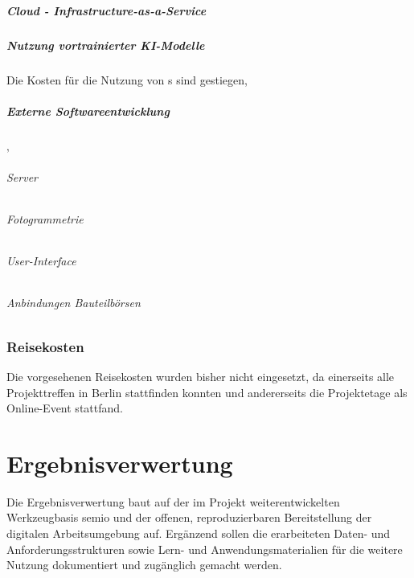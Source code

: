 \documentclass[type=zwischenbericht]{zukunftbau}
\begin{document}
\subsubsection{Cloud - Infrastructure-as-a-Service}
\subsubsection{Nutzung vortrainierter KI-Modelle}
Die Kosten für die Nutzung von s sind gestiegen, 

\subsubsection{Externe Softwareentwicklung}
\begin{SemioNest}‚
\paragraph{Server}
\paragraph{Fotogrammetrie}
\paragraph{User-Interface}
\paragraph{Anbindungen Bauteilbörsen}
\end{SemioNest}

\section{Reisekosten}

Die vorgesehenen Reisekosten wurden bisher nicht eingesetzt, da einerseits alle Projekttreffen in Berlin stattfinden konnten und andererseits die Projektetage als Online-Event stattfand.

\part{Ergebnisverwertung}

Die Ergebnisverwertung baut auf der im Projekt weiterentwickelten Werkzeugbasis semio und der offenen, reproduzierbaren Bereitstellung der digitalen Arbeitsumgebung auf. Ergänzend sollen die erarbeiteten Daten- und Anforderungsstrukturen sowie Lern- und Anwendungsmaterialien für die weitere Nutzung dokumentiert und zugänglich gemacht werden.
\end{document}
